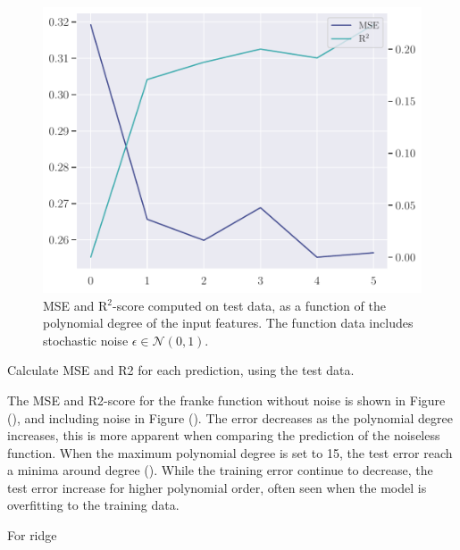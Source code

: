 \begin{figure}
    \centering
    \includegraphics[width=0.8\linewidth]{project-1/latex/figures/ols_error_noisy.pdf}
    \caption{MSE and R$^{2}$-score computed on test data, as a function of the polynomial degree of the input features. The function data includes stochastic noise $\epsilon \in \mathcal{N}(0, 1)$.}
    \label{fig:ols_error_noisy}
\end{figure}

Calculate MSE and R2 for each prediction, using the test data.

The MSE and R2-score for the franke function without noise is shown in Figure (), and including noise in Figure (). The error decreases as the polynomial degree increases, this is more apparent when comparing the prediction of the noiseless function. When the maximum polynomial degree is set to 15, the test error reach a minima around degree (). While the training error continue to decrease, the test error increase for higher polynomial order, often seen when the model is overfitting to the training data.

For ridge